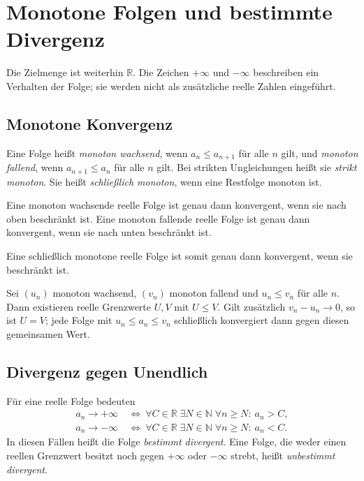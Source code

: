 \chapter{Monotone Folgen und bestimmte Divergenz}
\label{b21guide:ch:monotone}

Die Zielmenge ist weiterhin $\mathbb R$. Die Zeichen
$+\infty$ und $-\infty$ beschreiben ein Verhalten der Folge;
sie werden nicht als zusätzliche reelle Zahlen eingeführt.

\section{Monotone Konvergenz}

\begin{definition}
\label{b21guide:def:monotone}
Eine Folge heißt \emph{monoton wachsend}, wenn $a_n\leq a_{n+1}$
für alle $n$ gilt, und \emph{monoton fallend}, wenn
$a_{n+1}\leq a_n$ für alle $n$ gilt.
Bei strikten Ungleichungen heißt sie \emph{strikt monoton}.
Sie heißt \emph{schließlich monoton}, wenn eine Restfolge monoton ist.
\end{definition}

\begin{theorem}
\label{b21guide:thm:monotone-convergence}
Eine monoton wachsende reelle Folge ist genau dann konvergent,
wenn sie nach oben beschränkt ist.
Eine monoton fallende reelle Folge ist genau dann konvergent,
wenn sie nach unten beschränkt ist.

Eine schließlich monotone reelle Folge ist somit genau dann
konvergent, wenn sie beschränkt ist.
\end{theorem}

\begin{theorem}
\label{b21guide:thm:nested}
Sei $(u_n)$ monoton wachsend, $(v_n)$ monoton fallend und
$u_n\leq v_n$ für alle $n$.
Dann existieren reelle Grenzwerte $U,V$ mit $U\leq V$.
Gilt zusätzlich $v_n-u_n\to0$, so ist $U=V$;
jede Folge mit $u_n\leq a_n\leq v_n$ schließlich
konvergiert dann gegen diesen gemeinsamen Wert.
\end{theorem}

\section{Divergenz gegen Unendlich}

\begin{definition}
\label{b21guide:def:infinity}
Für eine reelle Folge bedeuten
\[
 \begin{aligned}
 a_n\to+\infty
 &\ \Longleftrightarrow\
 \forall C\in\mathbb R\;\exists N\in\mathbb N\;
 \forall n\geq N:\ a_n>C,\\
 a_n\to-\infty
 &\ \Longleftrightarrow\
 \forall C\in\mathbb R\;\exists N\in\mathbb N\;
 \forall n\geq N:\ a_n<C.
 \end{aligned}
\]
In diesen Fällen heißt die Folge \emph{bestimmt divergent}.
Eine Folge, die weder einen reellen Grenzwert besitzt noch
gegen $+\infty$ oder $-\infty$ strebt, heißt \emph{unbestimmt divergent}.
\end{definition}

